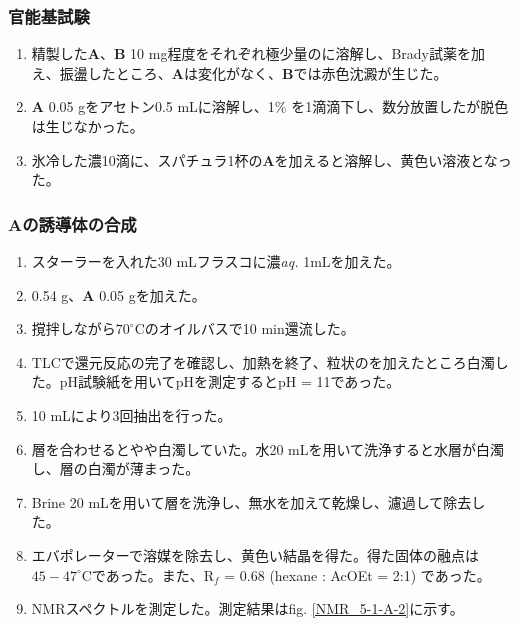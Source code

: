 \documentclass{ltjsarticle}
\theoremstyle{definition}
\numberwithin{equation}{section}
\newcommand{\D}{^\circ\text{C}}
\begin{document}
\subsubsection{官能基試験}
\begin{enumerate}
\item 精製した\textbf{A}、\textbf{B} 10 mg程度をそれぞれ極少量のに溶解し、Brady試薬を加え、振盪したところ、\textbf{A}は変化がなく、\textbf{B}では赤色沈澱が生じた。
\item \textbf{A} 0.05 gをアセトン0.5 mLに溶解し、1\%  を1滴滴下し、数分放置したが脱色は生じなかった。
\item 氷冷した濃10滴に、スパチュラ1杯の\textbf{A}を加えると溶解し、黄色い溶液となった。
\end{enumerate}

\subsubsection{\textbf{A}の誘導体の合成}
\begin{enumerate}
\item スターラーを入れた30 mLフラスコに濃\textit{aq.} 1mLを加えた。
\item {} 0.54 g、\textbf{A} 0.05 gを加えた。
\item 撹拌しながら$70\D$のオイルバスで10 min還流した。
\item TLCで還元反応の完了を確認し、加熱を終了、粒状のを加えたところ白濁した。pH試験紙を用いてpHを測定するとpH = 11であった。
\item {} 10 mLにより3回抽出を行った。
\item {}層を合わせるとやや白濁していた。水20 mLを用いて洗浄すると水層が白濁し、層の白濁が薄まった。
\item Brine 20 mLを用いて層を洗浄し、無水を加えて乾燥し、濾過して除去した。
\item エバポレーターで溶媒を除去し、黄色い結晶を得た。得た固体の融点は$45 - 47\D$であった。また、R$_f$ = 0.68 (hexane : AcOEt = 2:1) であった。
\item {} NMRスペクトルを測定した。測定結果はfig. \ref{NMR_5-1-A-2}に示す。
\end{enumerate}
\end{document}
